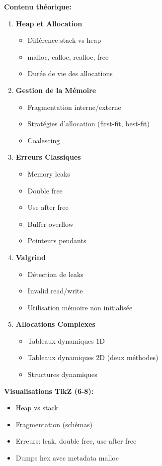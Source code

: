 \documentclass[10pt,a4paper]{article}
\begin{document}
\textbf{Contenu théorique:}
\begin{enumerate}
\item \textbf{Heap et Allocation}
   \begin{itemize}
   \item Différence stack vs heap
   \item malloc, calloc, realloc, free
   \item Durée de vie des allocations
   \end{itemize}

\item \textbf{Gestion de la Mémoire}
   \begin{itemize}
   \item Fragmentation interne/externe
   \item Stratégies d'allocation (first-fit, best-fit)
   \item Coalescing
   \end{itemize}

\item \textbf{Erreurs Classiques}
   \begin{itemize}
   \item Memory leaks
   \item Double free
   \item Use after free
   \item Buffer overflow
   \item Pointeurs pendants
   \end{itemize}

\item \textbf{Valgrind}
   \begin{itemize}
   \item Détection de leaks
   \item Invalid read/write
   \item Utilisation mémoire non initialisée
   \end{itemize}

\item \textbf{Allocations Complexes}
   \begin{itemize}
   \item Tableaux dynamiques 1D
   \item Tableaux dynamiques 2D (deux méthodes)
   \item Structures dynamiques
   \end{itemize}
\end{enumerate}

\textbf{Visualisations TikZ (6-8):}
\begin{itemize}
\item Heap vs stack
\item Fragmentation (schémas)
\item Erreurs: leak, double free, use after free
\item Dumps hex avec metadata malloc
\end{itemize}
\end{document}
